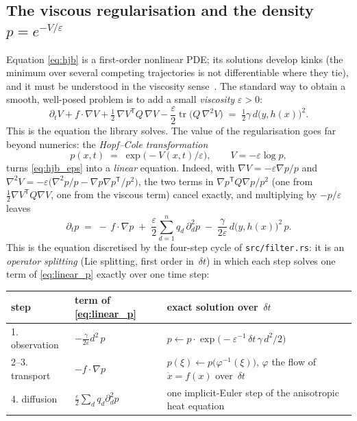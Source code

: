 \documentclass[11pt,a4paper]{article}
\newcommand{\tr}{\operatorname{tr}}
\newcommand{\T}{^{\mathsf T}}
\newcommand{\eps}{\varepsilon}
\newcommand{\grad}{\nabla}
\newcommand{\dt}{\,\delta t}
\theoremstyle{plain}
\theoremstyle{definition}
\theoremstyle{remark}
\begin{document}
\subsection{The viscous regularisation and the density \texorpdfstring{$p=e^{-V/\eps}$}{p = exp(-V/eps)}}

Equation \eqref{eq:hjb} is a first-order nonlinear PDE; its solutions develop kinks (the minimum over several competing trajectories is not differentiable where they tie), and it must be understood in the viscosity sense~\cite{FlemingSoner2006}. The standard way to obtain a smooth, well-posed problem is to add a small \emph{viscosity} $\eps>0$:
\begin{equation}
  \partial_t V + f\cdot\grad V + \tfrac12\,\grad V\T Q\,\grad V - \frac{\eps}{2}\tr\big(Q\,\grad^2 V\big) \;=\; \tfrac12\gamma\, d\big(y,h(x)\big)^2 .
  \label{eq:hjb_eps}
\end{equation}
This is the equation the library solves. The value of the regularisation goes far beyond numerics: the \emph{Hopf--Cole transformation}
\begin{equation}
  p(x,t) \;=\; \exp\!\big(-V(x,t)/\eps\big), \qquad V = -\eps\log p,
  \label{eq:hopfcole}
\end{equation}
turns \eqref{eq:hjb_eps} into a \emph{linear} equation. Indeed, with $\grad V=-\eps\grad p/p$ and $\grad^2 V = -\eps\big(\grad^2 p/p - \grad p\grad p\T/p^2\big)$, the two terms in $\grad p\T Q\grad p/p^2$ (one from $\tfrac12\grad V\T Q\grad V$, one from the viscous term) cancel exactly, and multiplying by $-p/\eps$ leaves
\begin{equation}
  \boxed{\;
  \partial_t p \;=\; -\,f\cdot\grad p \;+\; \frac{\eps}{2}\sum_{d=1}^n q_d\,\partial_d^2 p \;-\; \frac{\gamma}{2\eps}\, d\big(y,h(x)\big)^2\, p .\;}
  \label{eq:linear_p}
\end{equation}
This is the equation discretised by the four-step cycle of \texttt{src/filter.rs}: it is an \emph{operator splitting} (Lie splitting, first order in $\dt$) in which each step solves one term of \eqref{eq:linear_p} exactly over one time step:
\begin{center}
\begin{tabular}{@{}lll@{}}
\toprule
step & term of \eqref{eq:linear_p} & exact solution over $\dt$ \\
\midrule
1. observation & $-\frac{\gamma}{2\eps} d^2\, p$ & $p \leftarrow p\cdot\exp\!\big(-\eps^{-1}\dt\,\gamma\, d^2/2\big)$ \\
2--3. transport & $-f\cdot\grad p$ & $p(\xi) \leftarrow p\big(\varphi^{-1}(\xi)\big)$, $\varphi$ the flow of $\dot x=f(x)$ over $\dt$ \\
4. diffusion & $\frac{\eps}{2}\sum_d q_d\partial_d^2 p$ & one implicit-Euler step of the anisotropic heat equation \\
\bottomrule
\end{tabular}
\end{center}
\end{document}
